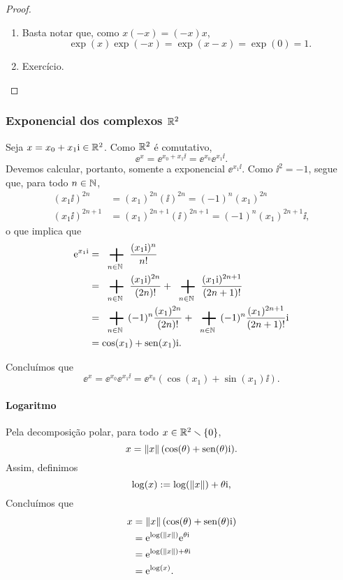 \begin{proof}
\begin{enumerate}
	\item Basta notar que, como $x(-x)=(-x)x$,
		\begin{equation*}
		\exp(x)\exp(-x) = \exp(x-x) = \exp(0) = 1.
		\end{equation*}
	
	\item Exercício. \qedhere
	\end{enumerate}
\end{proof}


\subsubsection{Exponencial dos complexos $\mathbb{R}^2$}

Seja $x = x_0 + x_1 \mathrm{i} \in \mathbb{R}^2$. Como $\mathbb{R}^2$ é comutativo,
	\begin{equation*}
	\ee^{x} = \ee^{x_0 + x_1 \ii} = \ee^{x_0}\ee^{x_1 \ii}.
	\end{equation*}
Devemos calcular, portanto, somente a exponencial $\ee^{x_1 \ii}$. Como $\ii^2 = -1$, segue que, para todo $n \in \mathbb{N}$,
	\begin{align*}
	(x_1 \ii)^{2n} &= (x_1)^{2n}(\ii)^{2n} = (-1)^n (x_1)^{2n} \\
	(x_1 \ii)^{2n+1} &= (x_1)^{2n+1}(\ii)^{2n+1} = (-1)^n (x_1)^{2n+1}\ii,
	\end{align*}
o que implica que
	\begin{align*}
	\ee^{x_1 \ii} &= \sum_{n \in \N} \frac{(x_1 \ii)^n}{n!} \\
		&= \sum_{n \in \N} \frac{(x_1 \ii)^{2n}}{(2n)!} + \sum_{n \in \N} \frac{(x_1 \ii)^{2n+1}}{(2n+1)!} \\
		&= \sum_{n \in \N} (-1)^n \frac{(x_1)^{2n}}{(2n)!} + \sum_{n \in \N} (-1)^n \frac{(x_1)^{2n+1}}{(2n+1)!}\ii \\
		&= \cos(x_1) + \sin(x_1)\ii.
	\end{align*}

Concluímos que
	\begin{equation*}
	\ee^{x} = \ee^{x_0}\ee^{x_1 \ii} = \ee^{x_0}(\cos(x_1) + \sin(x_1)\ii).
	\end{equation*}

\paragraph{Logaritmo} Pela decomposição polar, para todo $x \in \mathbb{R}^2 \smallsetminus \{0\}$,
	\begin{equation*}
	x = \left\Vert{x}\right\Vert(\cos(\theta)+\operatorname{sen}(\theta)\mathrm{i}).
	\end{equation*}
Assim, definimos
	\begin{equation*}
	\log(x) := \log(\left\Vert{x}\right\Vert) + \theta \mathrm{i},
	\end{equation*}
Concluímos que
	\begin{align*}
	x &= \left\Vert{x}\right\Vert(\cos(\theta)+\operatorname{sen}(\theta) \mathrm{i}) \\
		&= \mathrm{e}^{\log(\left\Vert{x}\right\Vert)}\mathrm{e}^{\theta \mathrm{i}} \\
		&= \mathrm{e}^{\log(\left\Vert{x}\right\Vert) + \theta \mathrm{i}} \\
		&= \mathrm{e}^{\log(x)}.
	\end{align*}

